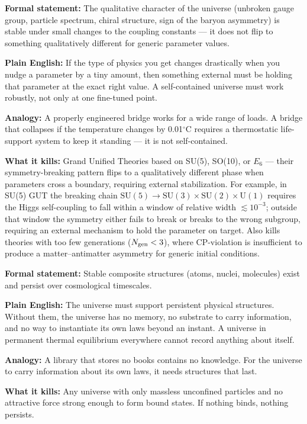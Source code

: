 \documentclass[11pt,a4paper]{article}
\begin{document}
\begin{tcolorbox}[colback=boxgreen,colframe=green!50!black,
  title=Axiom 2 — NM*: Structural Stability,breakable]
\textbf{Formal statement:} The qualitative character of the universe (unbroken gauge
group, particle spectrum, chiral structure, sign of the baryon asymmetry) is stable
under small changes to the coupling constants — it does not flip to something
qualitatively different for generic parameter values.

\medskip
\textbf{Plain English:} If the type of physics you get changes drastically when you
nudge a parameter by a tiny amount, then something external must be holding that
parameter at the exact right value.  A self-contained universe must work robustly, not
only at one fine-tuned point.

\medskip
\textbf{Analogy:} A properly engineered bridge works for a wide range of loads.
A bridge that collapses if the temperature changes by 0.01$^\circ$C requires a
thermostatic life-support system to keep it standing — it is not self-contained.

\medskip
\textbf{What it kills:} Grand Unified Theories based on SU(5), SO(10), or $E_6$
--- their symmetry-breaking pattern flips to a qualitatively different phase when
parameters cross a boundary, requiring external stabilization.
For example, in SU(5) GUT the breaking chain $\mathrm{SU}(5) \to \mathrm{SU}(3) \times
\mathrm{SU}(2) \times \mathrm{U}(1)$ requires the Higgs self-coupling to fall within a
window of relative width $\lesssim 10^{-3}$; outside that window the symmetry either
fails to break or breaks to the wrong subgroup, requiring an external mechanism to hold
the parameter on target.
Also kills theories with too few generations ($N_{\rm gen} < 3$), where
CP-violation is insufficient to produce a matter--antimatter asymmetry for generic
initial conditions.
\end{tcolorbox}

\bigskip

\begin{tcolorbox}[colback=boxgreen,colframe=green!50!black,
  title=Axiom 3 — TV: Thermodynamic Viability,breakable]
\textbf{Formal statement:} Stable composite structures (atoms, nuclei, molecules) exist
and persist over cosmological timescales.

\medskip
\textbf{Plain English:} The universe must support persistent physical structures.
Without them, the universe has no memory, no substrate to carry information, and no way
to instantiate its own laws beyond an instant.  A universe in permanent thermal
equilibrium everywhere cannot record anything about itself.

\medskip
\textbf{Analogy:} A library that stores no books contains no knowledge.  For the
universe to carry information about its own laws, it needs structures that last.

\medskip
\textbf{What it kills:} Any universe with only massless unconfined particles and no
attractive force strong enough to form bound states.  If nothing binds, nothing persists.
\end{tcolorbox}
\end{document}

